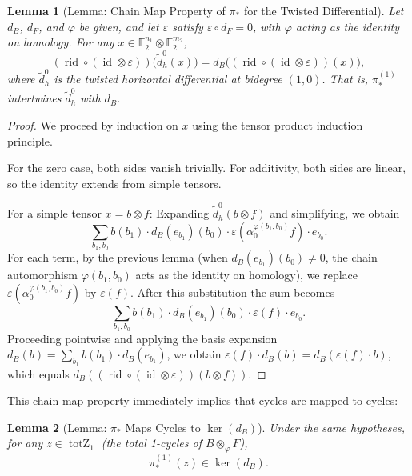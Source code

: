 \documentclass[11pt]{article}
\theoremstyle{plain}
\newtheorem*{lemma}{Lemma}
\theoremstyle{definition}
\theoremstyle{remark}
\renewcommand{\ker}{\operatorname{ker}}
\begin{document}
\begin{lemma}[Lemma: Chain Map Property of $\pi_*$ for the Twisted Differential]
Let $d_B$, $d_F$, and $\varphi$ be given, and let $\varepsilon$ satisfy $\varepsilon \circ d_F = 0$, with $\varphi$ acting as the identity on homology. For any $x \in \mathbb{F}_2^{n_1} \otimes \mathbb{F}_2^{m_2}$,
\[
(\operatorname{rid} \circ (\operatorname{id} \otimes \varepsilon))\bigl(\widetilde{d}_h^0(x)\bigr) = d_B\bigl((\operatorname{rid} \circ (\operatorname{id} \otimes \varepsilon))(x)\bigr),
\]
where $\widetilde{d}_h^0$ is the twisted horizontal differential at bidegree $(1,0)$.
That is, $\pi_*^{(1)}$ intertwines $\widetilde{d}_h^0$ with $d_B$.
\end{lemma}

\begin{proof}
We proceed by induction on $x$ using the tensor product induction principle.

For the zero case, both sides vanish trivially. For additivity, both sides are linear, so the identity extends from simple tensors.

For a simple tensor $x = b \otimes f$: Expanding $\widetilde{d}_h^0(b \otimes f)$ and simplifying, we obtain
\[
\sum_{b_1, b_0} b(b_1) \cdot d_B(e_{b_1})(b_0) \cdot \varepsilon(\alpha_0^{\varphi(b_1,b_0)} f) \cdot e_{b_0}.
\]
For each term, by the previous lemma (when $d_B(e_{b_1})(b_0) \neq 0$, the chain automorphism $\varphi(b_1,b_0)$ acts as the identity on homology), we replace $\varepsilon(\alpha_0^{\varphi(b_1,b_0)} f)$ by $\varepsilon(f)$. After this substitution the sum becomes
\[
\sum_{b_1, b_0} b(b_1) \cdot d_B(e_{b_1})(b_0) \cdot \varepsilon(f) \cdot e_{b_0}.
\]
Proceeding pointwise and applying the basis expansion $d_B(b) = \sum_{b_1} b(b_1) \cdot d_B(e_{b_1})$, we obtain $\varepsilon(f) \cdot d_B(b) = d_B(\varepsilon(f) \cdot b)$, which equals $d_B((\operatorname{rid} \circ (\operatorname{id} \otimes \varepsilon))(b \otimes f))$.
\end{proof}

This chain map property immediately implies that cycles are mapped to cycles:

\begin{lemma}[Lemma: $\pi_*$ Maps Cycles to $\ker(d_B)$]
Under the same hypotheses, for any $z \in \operatorname{totZ}_1$ (the total 1-cycles of $B \otimes_\varphi F$),
\[
\pi_*^{(1)}(z) \in \ker(d_B).
\]
\end{lemma}
\end{document}
